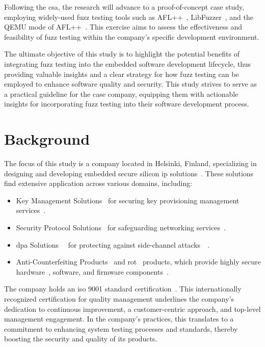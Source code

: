 Following the \gls{csa}, the research will advance to a proof-of-concept case
study, employing widely-used fuzz testing tools such as AFL++~\cite{257204},
LibFuzzer~\cite{libFuzze17:online}, and the QEMU mode of AFL++~\cite{AFLplusp57:online}.
This exercise aims to assess the effectiveness and feasibility of fuzz testing
within the company's specific development environment.

The ultimate objective of this study is to highlight the potential benefits of
integrating fuzz testing into the embedded software development lifecycle, thus
providing valuable insights and a clear strategy for how fuzz testing can be
employed to enhance software quality and security. This study strives to serve as
a practical guideline for the case company, equipping them with actionable
insights for incorporating fuzz testing into their software development process.

\section{Background}

The focus of this study is a company located in Helsinki, Finland, specializing in designing
and developing embedded secure silicon \acrlong{ip} solutions~\cite{Whatisan76:online}.
These solutions find extensive application across various domains, including:

\begin{itemize}
\item Key Management Solutions~\cite{WhatisKe81:online} for securing key provisioning
      management services~\cite{WhatisPr3:online}.
\item Security Protocol Solutions~\cite{TypesofS33:online} for safeguarding
      networking services~\cite{kwon2014drives}.
\item \gls{dpa} Solutions~\cite{Differen58:online}~\cite{SIDECHAN21:online} for
      protecting against side-channel attacks~\cite{SIDECHAN21:online}~\cite{standaert2010introduction}.
\item Anti-Counterfeiting Products~\cite{PuttingA14:online} and \gls{rot}~\cite{WhatisRo39:online} products,
      which provide highly secure hardware~\cite{WhatisHa66:online}, software, and firmware components~\cite{WhatIsFi49:online}.
\end{itemize}

The company holds an \acrlong{iso} 9001 standard certification~\cite{ISOISO9044:online}.
This internationally recognized certification for quality management
underlines the company's dedication to continuous improvement,
a customer-centric approach, and top-level management engagement.
In the company's practices, this translates to a
commitment to enhancing system testing processes and standards, thereby
boosting the security and quality of its products.

